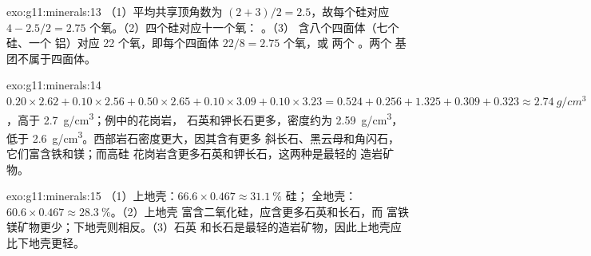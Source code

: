\begin{solution}{exo:g11:minerals:13}
（1）平均共享顶角数为 $(2 + 3)/2 = 2.5$，故每个硅对应
$4 - 2.5/2 = 2.75$ 个氧。（2）四个硅对应十一个氧：
。（3） 含八个四面体（七个硅、一个
铝）对应 22 个氧，即每个四面体 $22/8 = 2.75$ 个氧，或
两个 。两个  基团不属于四面体。
\end{solution}

\begin{solution}{exo:g11:minerals:14}
$0.20 \times 2.62 + 0.10 \times 2.56 + 0.50 \times 2.65 + 0.10 \times 3.09 +
0.10 \times 3.23 = 0.524 + 0.256 + 1.325 + 0.309 + 0.323 \approx
\qty{2.74}{g/cm^3}$，高于 \qty{2.7}{g/cm^3}；例中的花岗岩，
石英和钾长石更多，密度约为 \qty{2.59}{g/cm^3}，低于
\qty{2.6}{g/cm^3}。西部岩石密度更大，因其含有更多
斜长石、黑云母和角闪石，它们富含铁和镁；而高硅
花岗岩含更多石英和钾长石，这两种是最轻的
造岩矿物。
\end{solution}

\begin{solution}{exo:g11:minerals:15}
（1）上地壳：$66.6 \times 0.467 \approx \qty{31.1}{\percent}$ 硅；
全地壳：$60.6 \times 0.467 \approx \qty{28.3}{\percent}$。（2）上地壳
富含二氧化硅，应含更多石英和长石，而
富铁镁矿物更少；下地壳则相反。（3）石英
和长石是最轻的造岩矿物，因此上地壳应
比下地壳更轻。
\end{solution}

